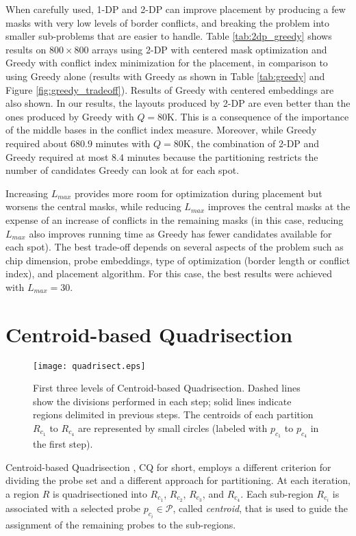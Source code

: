 When carefully used, 1-DP and 2-DP can improve placement by producing a few
masks with very low levels of border conflicts, and breaking the problem into
smaller sub-problems that are easier to handle. Table \ref{tab:2dp_greedy} shows
results on $800\times 800$ arrays using 2-DP with centered mask optimization and
Greedy with conflict index minimization for the placement, in comparison to
using Greedy alone (results with Greedy as shown in Table \ref{tab:greedy} and
Figure \ref{fig:greedy_tradeoff}). Results of Greedy with centered embeddings
are also shown. In our results, the layouts produced by 2-DP are even better
than the ones produced by Greedy with $Q=80$K. This is a consequence of the
importance of the middle bases in the conflict index measure. Moreover, while
Greedy required about $680.9$ minutes with $Q=80$K, the combination of 2-DP and
Greedy required at most $8.4$ minutes because the partitioning restricts the
number of candidates Greedy can look at for each spot.

Increasing $L_{max}$ provides more room for optimization during placement but
worsens the central masks, while reducing $L_{max}$ improves the central masks
at the expense of an increase of conflicts in the remaining masks (in this case,
reducing $L_{max}$ also improves running time as Greedy has fewer candidates
available for each spot). The best trade-off depends on several aspects of the
problem such as chip dimension, probe embeddings, type of optimization (border
length or conflict index), and placement algorithm. For this case, the best
results were achieved with $L_{max}=30$.

\section{Centroid-based Quadrisection}
\label{sec:part_cq}

\begin{figure}\centering
\texttt{[image: quadrisect.eps]}
\caption{\label{fig:quadrisect}%
  First three levels of Centroid-based Quadrisection. Dashed lines show the
  divisions performed in each step; solid lines indicate regions delimited in
  previous steps. The centroids of each partition $R_{c_1}$ to $R_{c_4}$ are
  represented by small circles (labeled with $p_{c_1}$ to $p_{c_4}$ in the
  first step).}
\end{figure}

Centroid-based Quadrisection \citep{Kahng2003a}, CQ for short, employs a
different criterion for dividing the probe set and a different approach for
partitioning. At each iteration, a region $R$ is quadrisectioned into $R_{c_1}$,
$R_{c_2}$, $R_{c_3}$, and $R_{c_4}$. Each sub-region $R_{c_i}$ is associated
with a selected probe $p_{c_i}\in \mathcal{P}$, called \emph{centroid}, that is
used to guide the assignment of the remaining probes to the sub-regions.

